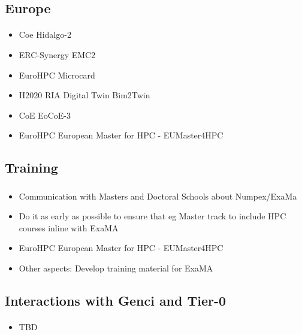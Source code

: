 \subsection{Europe}
\begin{frame}{\insertsectionhead}
  \framesubtitle{\insertsubsectionhead}
\begin{itemize}
    \item Coe Hidalgo-2 
    \item ERC-Synergy	EMC2
    \item EuroHPC	Microcard
    \item H2020 RIA Digital Twin	Bim2Twin
    \item CoE	EoCoE-3	
    \item EuroHPC	European Master for HPC - EUMaster4HPC	
\end{itemize}
\end{frame}

\subsection{Training}
\begin{frame}
  \frametitle{\insertsectionhead}
  \framesubtitle{\insertsubsectionhead}
  
  \begin{itemize}
    \item Communication with Masters and Doctoral Schools about Numpex/ExaMa
    \item Do it as early as possible to ensure that eg Master track to include HPC courses inline with ExaMA
    \item EuroHPC	European Master for HPC - EUMaster4HPC	
    \item Other aspects: Develop training material for ExaMA
  \end{itemize}
\end{frame}
\subsection{Interactions with Genci and Tier-0}
\begin{frame}{\insertsectionhead}
  \framesubtitle{\insertsubsectionhead}

\begin{itemize}
    \item TBD
\end{itemize}
\end{frame}
